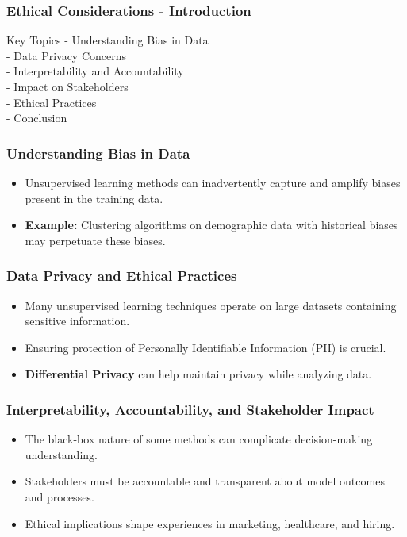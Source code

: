 \documentclass[aspectratio=169]{beamer}
\begin{document}
\begin{frame}[fragile]
    \frametitle{Ethical Considerations - Introduction}
    \begin{block}{Key Topics}
        - Understanding Bias in Data \\
        - Data Privacy Concerns \\
        - Interpretability and Accountability \\
        - Impact on Stakeholders \\
        - Ethical Practices \\
        - Conclusion
    \end{block}
\end{frame}

\begin{frame}[fragile]
    \frametitle{Understanding Bias in Data}
    \begin{itemize}
        \item Unsupervised learning methods can inadvertently capture and amplify biases present in the training data.
        \item \textbf{Example:} Clustering algorithms on demographic data with historical biases may perpetuate these biases.
    \end{itemize}
\end{frame}

\begin{frame}[fragile]
    \frametitle{Data Privacy and Ethical Practices}
    \begin{itemize}
        \item Many unsupervised learning techniques operate on large datasets containing sensitive information.
        \item Ensuring protection of Personally Identifiable Information (PII) is crucial.
        \item \textbf{Differential Privacy} can help maintain privacy while analyzing data.
    \end{itemize}
\end{frame}

\begin{frame}[fragile]
    \frametitle{Interpretability, Accountability, and Stakeholder Impact}
    \begin{itemize}
        \item The black-box nature of some methods can complicate decision-making understanding.
        \item Stakeholders must be accountable and transparent about model outcomes and processes.
        \item Ethical implications shape experiences in marketing, healthcare, and hiring.
    \end{itemize}
\end{frame}
\end{document}
